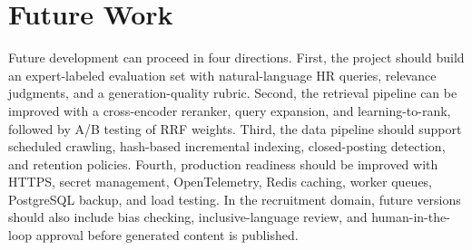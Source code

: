\documentclass[12pt,a4paper,oneside]{report}
\begin{document}
\section{Future Work}
Future development can proceed in four directions. First, the project should build an expert-labeled evaluation set with natural-language HR queries, relevance judgments, and a generation-quality rubric. Second, the retrieval pipeline can be improved with a cross-encoder reranker, query expansion, and learning-to-rank, followed by A/B testing of RRF weights. Third, the data pipeline should support scheduled crawling, hash-based incremental indexing, closed-posting detection, and retention policies. Fourth, production readiness should be improved with HTTPS, secret management, OpenTelemetry, Redis caching, worker queues, PostgreSQL backup, and load testing. In the recruitment domain, future versions should also include bias checking, inclusive-language review, and human-in-the-loop approval before generated content is published.
\end{document}
